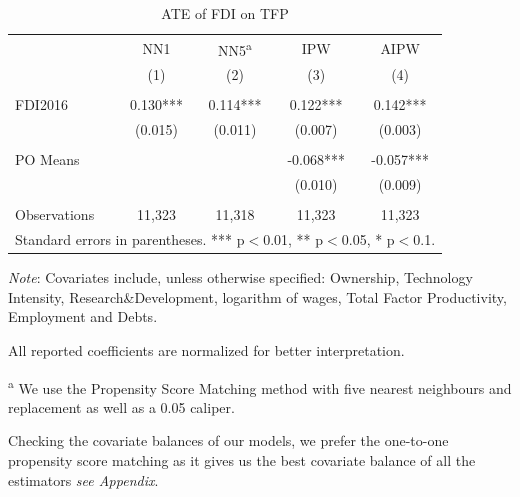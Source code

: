 \documentclass[a4paper,11pt]{scrartcl}
\begin{document}
\begin{table}[h]
 	\centering
   	\caption{ATE of FDI on TFP}
   	\label{tab:mainresults}
\begin{threeparttable}

\begin{tabular}{lcccc} 
	\hline
	\hline
 			& NN1 & NN5\textsuperscript{a} & IPW & AIPW \\
 			& (1) & (2) & (3)  & (4) \\ \hline
 			&  &  &  &    \\
FDI2016 	& 0.130*** & 0.114*** & 0.122***  & 0.142***   \\
 			& (0.015) & (0.011) & (0.007) &   (0.003)  \\
 	&  &  &  &    \\
PO Means 	& & & -0.068*** &  -0.057*** \\
			&  &  & (0.010)  &  (0.009) \\
			&  &  &  &    \\
 Observations & 11,323 & 11,318 & 11,323 & 11,323 \\ 
 	\hline
 	\hline
	\multicolumn{5}{c}{\footnotesize{Standard errors in parentheses. *** p$<$0.01, ** p$<$0.05, * p$<$0.1. }}
\end{tabular}

\begin{tablenotes}[flushleft]
      \footnotesize
\item \textit{Note}: Covariates include, unless otherwise specified: Ownership, Technology Intensity, Research\&Development, logarithm of wages, Total Factor Productivity, Employment and Debts. 
\item All reported coefficients are normalized for better interpretation. %
\item\textsuperscript{a} We use the Propensity Score Matching method with five nearest neighbours and replacement as well as a 0.05 caliper. 
\end{tablenotes}

\end{threeparttable}
\end{table}

Checking the covariate balances of our models, we prefer the one-to-one propensity score matching as it gives us the best covariate balance of all the estimators \textit{see Appendix}. %
\end{document}

